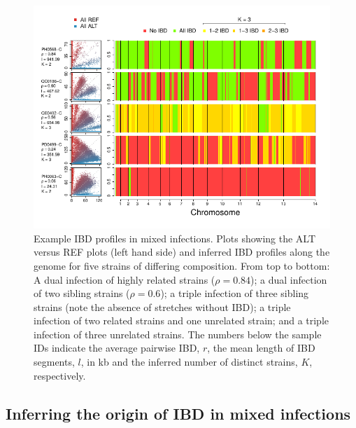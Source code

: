 \documentclass[9pt,lineno]{elife}
\begin{document}
\begin{figure}[ht]
  \begin{center}
  \includegraphics[width=.9\textwidth]{Fig5.pdf}
    \caption{Example IBD profiles in mixed infections. Plots showing the ALT versus REF plots (left hand side) and inferred IBD profiles along the genome for five strains of differing composition.  From top to bottom: A dual infection of highly related strains ($\rho = 0.84$); a dual infection of two sibling strains ($\rho = 0.6$); a triple infection of three sibling strains (note the absence of stretches without IBD); a triple infection of two related strains and one unrelated strain; and a triple infection of three unrelated strains.  The numbers below the sample IDs indicate the average pairwise IBD, $r$,  the mean length of IBD segments, $l$, in kb and the inferred number of distinct strains, $K$, respectively.}\label{fig:strainIBD}
    \end{center}
\end{figure}




\subsection{Inferring the origin of IBD in mixed infections}
\end{document}
